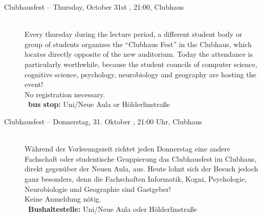 \begin{description}
\ifml
    \item[Clubhausfest -- Thursday, October 31st \YEAR, 21:00, Clubhaus]\ \\
	Every thursday during the lecture period, a different student body or group of students organizes the "`Clubhaus Fest"' in
	the Clubhaus, which locates directly opposite of the new auditorium. Today the attendance is particularly worthwhile, because
	the student councils of computer science, cognitive science, psychology, neurobiology and geography are hosting the event! \\
	No registration necessary.\\
	~\textbf{bus stop:} Uni/Neue Aula or Hölderlinstraße
\else
    \item[Clubhausfest -- Donnerstag, 31. Oktober \YEAR, 21:00 Uhr, Clubhaus]\ \\
	Während der Vorlesungszeit richtet jeden Donnerstag eine andere Fachschaft oder studentische Gruppierung das Clubhausfest
	im Clubhaus, direkt gegenüber der Neuen Aula, aus. Heute lohnt sich der Besuch jedoch ganz besonders, denn die Fachschaften
	Informatik, Kogni, Psychologie, Neurobiologie und Geographie sind Gastgeber! \\
	Keine Anmeldung nötig.\\
	~\textbf{Bushaltestelle:} Uni/Neue Aula oder Hölderlinstraße
\fi

\ifmaster \iflehramt \pagebreak  \fi \fi



\end{description}

